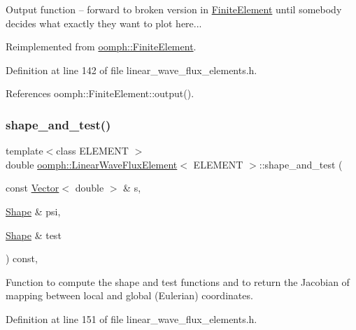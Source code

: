 Output function -- forward to broken version in \hyperlink{classoomph_1_1FiniteElement}{Finite\+Element} until somebody decides what exactly they want to plot here... 



Reimplemented from \hyperlink{classoomph_1_1FiniteElement_adfaee690bb0608f03320eeb9d110d48c}{oomph\+::\+Finite\+Element}.



Definition at line 142 of file linear\+\_\+wave\+\_\+flux\+\_\+elements.\+h.



References oomph\+::\+Finite\+Element\+::output().

\mbox{\label{classoomph_1_1LinearWaveFluxElement_ae9568e5e47bea6bbcb17ef1b88a2845b}} 
\subsubsection{\texorpdfstring{shape\+\_\+and\+\_\+test()}{shape\_and\_test()}}
{\footnotesize\ttfamily template$<$class E\+L\+E\+M\+E\+NT $>$ \\
double \hyperlink{classoomph_1_1LinearWaveFluxElement}{oomph\+::\+Linear\+Wave\+Flux\+Element}$<$ E\+L\+E\+M\+E\+NT $>$\+::shape\+\_\+and\+\_\+test (\begin{DoxyParamCaption}\item[{const \hyperlink{classoomph_1_1Vector}{Vector}$<$ double $>$ \&}]{s,  }\item[{\hyperlink{classoomph_1_1Shape}{Shape} \&}]{psi,  }\item[{\hyperlink{classoomph_1_1Shape}{Shape} \&}]{test }\end{DoxyParamCaption}) const\hspace{0.3cm}{\ttfamily [inline]}, {\ttfamily [protected]}}



Function to compute the shape and test functions and to return the Jacobian of mapping between local and global (Eulerian) coordinates. 



Definition at line 151 of file linear\+\_\+wave\+\_\+flux\+\_\+elements.\+h.



